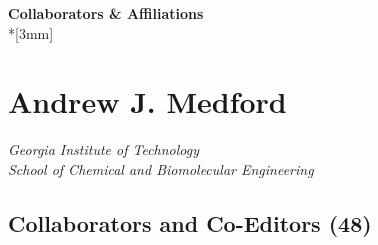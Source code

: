 \renewcommand{\LeftFooter}{Collaborators \& Affiliations}
\renewcommand{\LeftHeader}{Andrew J. Medford}
\renewcommand{\PageLimit}{0}
\begin{center}
{\bf Collaborators \& Affiliations} \\*[3mm]
\end{center}

\setcounter{section}{0}

\section*{Andrew J. Medford}

\emph{Georgia Institute of Technology}\\\emph{School of Chemical and
Biomolecular Engineering}

\subsection*{Collaborators and Co-Editors
(48)}\label{collaborators-and-co-editors-48}

